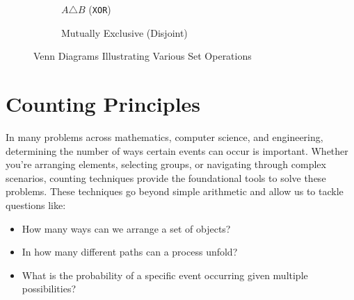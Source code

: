 \begin{figure}[h]
\begin{subfigure}[b]{0.45\textwidth}
                \caption{$A \triangle B$ (\texttt{XOR})}
                \label{fig:venn_xor}
            \end{subfigure}
            
            \vspace{10pt} %
            \begin{subfigure}[b]{0.5\textwidth}
                \centering
                \caption{Mutually Exclusive (Disjoint)}
                \label{fig:venn6}
            \end{subfigure}
            \caption{Venn Diagrams Illustrating Various Set Operations}
            \label{fig:venn_diagrams}
        \end{figure}
        

\section{Counting Principles}

In many problems across mathematics, computer science, and engineering, determining the number of ways certain events can occur is important. Whether you're arranging elements, selecting groups, or navigating through complex scenarios, counting techniques provide the foundational tools to solve these problems. These techniques go beyond simple arithmetic and allow us to tackle questions like:

\begin{itemize}
    \item How many ways can we arrange a set of objects?
    \item In how many different paths can a process unfold?
    \item What is the probability of a specific event occurring given multiple possibilities?
\end{itemize}

